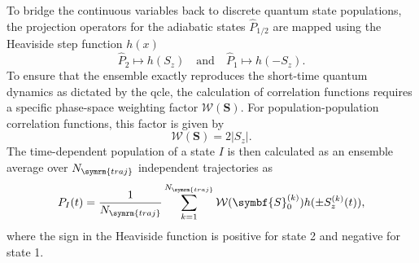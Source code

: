 To bridge the continuous variables back to discrete quantum state populations, the projection operators for the adiabatic states $\hat{P}_{1/2}$ are mapped using the Heaviside step function $h(x)$
\begin{equation}
\hat{P}_2\mapsto h(S_z)\quad\text{and}\quad\hat{P}_1\mapsto h(-S_z).
\end{equation}
To ensure that the ensemble exactly reproduces the short-time quantum dynamics as dictated by the \gls{qcle}, the calculation of correlation functions requires a specific phase-space weighting factor $\mathcal{W}(\symbf{S})$. For population-population correlation functions, this factor is given by
\begin{equation}
\mathcal{W}(\symbf{S})=2\lvert S_z\rvert.
\end{equation}
The time-dependent population of a state $I$ is then calculated as an ensemble average over $N_{\symrm{traj}}$ independent trajectories as
\begin{equation}
P_I(t)=\frac{1}{N_{\symrm{traj}}}\sum_{k=1}^{N_{\symrm{traj}}}\mathcal{W}(\symbf{S}_0^{(k)}) h(\pm S_z^{(k)}(t)),
\end{equation}
where the sign in the Heaviside function is positive for state 2 and negative for state 1.
